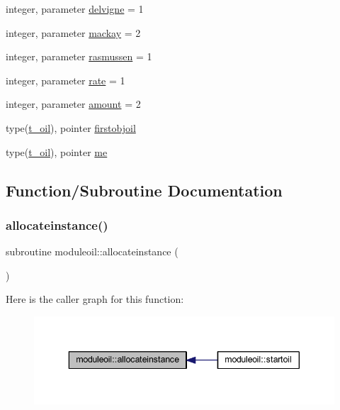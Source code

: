 \begin{DoxyCompactItemize}
\item 
integer, parameter \mbox{\hyperlink{namespacemoduleoil_a801bc9da7585a2b9fbc555af6b0f1567}{delvigne}} = 1
\item 
integer, parameter \mbox{\hyperlink{namespacemoduleoil_a1d25086a7015cf324c3af9b593a745db}{mackay}} = 2
\item 
integer, parameter \mbox{\hyperlink{namespacemoduleoil_a1f519bc3501a2da321237e65077b9b85}{rasmussen}} = 1
\item 
integer, parameter \mbox{\hyperlink{namespacemoduleoil_a3cd7562168c72c156b2f1f6e784a5ae3}{rate}} = 1
\item 
integer, parameter \mbox{\hyperlink{namespacemoduleoil_a648f61975720c552bfe6573b095ffa9e}{amount}} = 2
\item 
type(\mbox{\hyperlink{structmoduleoil_1_1t__oil}{t\+\_\+oil}}), pointer \mbox{\hyperlink{namespacemoduleoil_a24a707e47b13ce99f1028c4db28223a3}{firstobjoil}}
\item 
type(\mbox{\hyperlink{structmoduleoil_1_1t__oil}{t\+\_\+oil}}), pointer \mbox{\hyperlink{namespacemoduleoil_a70419f6d697dd70aed5f5dff114f475f}{me}}
\end{DoxyCompactItemize}


\subsection{Function/\+Subroutine Documentation}
\mbox{\label{namespacemoduleoil_a932062e4d214e9b1e3f8504bad7dee40}} 
\subsubsection{\texorpdfstring{allocateinstance()}{allocateinstance()}}
{\footnotesize\ttfamily subroutine moduleoil\+::allocateinstance (\begin{DoxyParamCaption}{ }\end{DoxyParamCaption})\hspace{0.3cm}{\ttfamily [private]}}

Here is the caller graph for this function\+:\nopagebreak
\begin{figure}[H]
\begin{center}
\leavevmode
\includegraphics[width=343pt]{namespacemoduleoil_a932062e4d214e9b1e3f8504bad7dee40_icgraph}
\end{center}
\end{figure}
\mbox{\label{namespacemoduleoil_af70b4b1248473e837294505db4f7ec5b}} 
